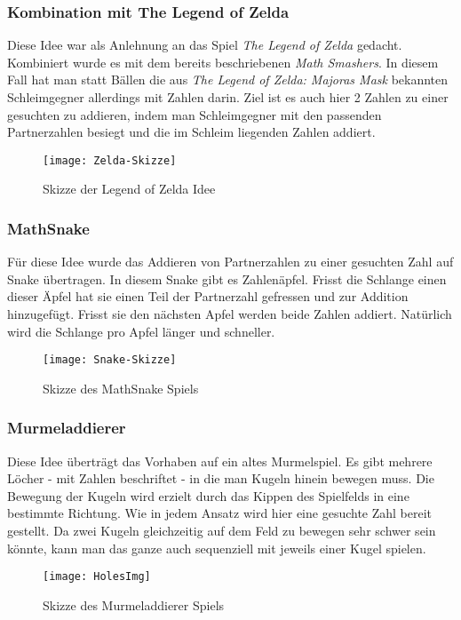 \subsubsection{Kombination mit The Legend of Zelda}
Diese Idee war als Anlehnung an das Spiel \textit{The Legend of Zelda} gedacht. Kombiniert wurde es mit dem bereits beschriebenen \textit{Math Smashers}. In diesem Fall hat man statt Bällen die aus \textit{The Legend of Zelda: Majoras Mask} bekannten Schleimgegner allerdings mit Zahlen darin. Ziel ist es auch hier 2 Zahlen zu einer gesuchten zu addieren, indem man Schleimgegner mit den passenden Partnerzahlen besiegt und die im Schleim liegenden Zahlen addiert.
\begin{figure}[htb]
	\centering
	\texttt{[image: Zelda-Skizze]}
	\caption{Skizze der Legend of Zelda Idee\label{fig:zelda}}
\end{figure}
\subsubsection{MathSnake}
Für diese Idee wurde das Addieren von Partnerzahlen zu einer gesuchten Zahl auf Snake übertragen. In diesem Snake gibt es Zahlenäpfel. Frisst die Schlange einen dieser Äpfel hat sie einen Teil der Partnerzahl gefressen und zur Addition hinzugefügt. Frisst sie den nächsten Apfel werden beide Zahlen addiert. Natürlich wird die Schlange pro Apfel länger und schneller.
\begin{figure}[htb]
	\centering
	\texttt{[image: Snake-Skizze]}
	\caption{Skizze des MathSnake Spiels\label{fig:mathsnake}}
\end{figure}
\newpage
\subsubsection{Murmeladdierer}
Diese Idee überträgt das Vorhaben auf ein altes Murmelspiel. Es gibt mehrere Löcher - mit Zahlen beschriftet - in die man Kugeln hinein bewegen muss. Die Bewegung der Kugeln wird erzielt durch das Kippen des Spielfelds in eine bestimmte Richtung. Wie in jedem Ansatz wird hier eine gesuchte Zahl bereit gestellt. Da zwei Kugeln gleichzeitig auf dem Feld zu bewegen sehr schwer sein könnte, kann man das ganze auch sequenziell mit jeweils einer Kugel spielen.
\begin{figure}[htb]
	\centering
	\texttt{[image: HolesImg]}
	\caption{Skizze des Murmeladdierer Spiels\label{fig:murmadd}}
\end{figure}
